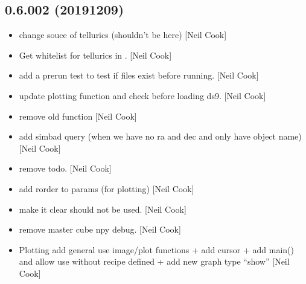 \documentclass[a4paper,10pt,english]{report}
\begin{document}
\subsection{0.6.002 (2019\sphinxhyphen{}12\sphinxhyphen{}09)}
\label{\detokenize{misc/changelog:id35}}\begin{itemize}
\item {} 
 \sphinxhyphen{} change souce of tellurics (shouldn’t be
here) {[}Neil Cook{]}

\item {} 
Get whitelist for tellurics in . {[}Neil Cook{]}

\item {} 
 \sphinxhyphen{} add a pre\sphinxhyphen{}run test to test if
files exist before running. {[}Neil Cook{]}

\item {} 
 \sphinxhyphen{} update plotting function and
check before loading ds9. {[}Neil Cook{]}

\item {} 
 \sphinxhyphen{} remove old function 
{[}Neil Cook{]}

\item {} 
 \sphinxhyphen{} add simbad query (when we have no ra
and dec and only have object name) {[}Neil Cook{]}

\item {} 
 \sphinxhyphen{} remove todo. {[}Neil Cook{]}

\item {} 
 \sphinxhyphen{} add rorder to params (for plotting)
{[}Neil Cook{]}

\item {} 
 \sphinxhyphen{} make it clear 
should not be used. {[}Neil Cook{]}

\item {} 
 \sphinxhyphen{} remove master cube npy
debug. {[}Neil Cook{]}

\item {} 
Plotting \sphinxhyphen{} add general use image/plot functions + add cursor + add
main() and allow use without recipe defined + add new graph type
“show” {[}Neil Cook{]}


\end{itemize}
\end{document}
